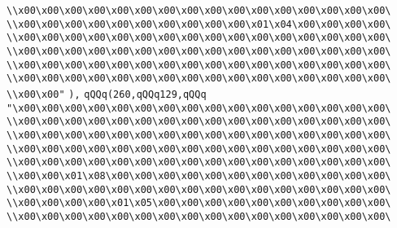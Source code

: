 \verb|\\x00\x00\x00\x00\x00\x00\x00\x00\x00\x00\x00\x00\x00\x00\x00\x00\|\newline
\verb|\\x00\x00\x00\x00\x00\x00\x00\x00\x00\x00\x01\x04\x00\x00\x00\x00\|\newline
\verb|\\x00\x00\x00\x00\x00\x00\x00\x00\x00\x00\x00\x00\x00\x00\x00\x00\|\newline
\verb|\\x00\x00\x00\x00\x00\x00\x00\x00\x00\x00\x00\x00\x00\x00\x00\x00\|\newline
\verb|\\x00\x00\x00\x00\x00\x00\x00\x00\x00\x00\x00\x00\x00\x00\x00\x00\|\newline
\verb|\\x00\x00\x00\x00\x00\x00\x00\x00\x00\x00\x00\x00\x00\x00\x00\x00\|\newline
\verb|\\x00\x00"|\newline
\verb|),|\newline
\verb|qQQq(260,qQQq129,qQQq|\newline
\verb|"\x00\x00\x00\x00\x00\x00\x00\x00\x00\x00\x00\x00\x00\x00\x00\x00\|\newline
\verb|\\x00\x00\x00\x00\x00\x00\x00\x00\x00\x00\x00\x00\x00\x00\x00\x00\|\newline
\verb|\\x00\x00\x00\x00\x00\x00\x00\x00\x00\x00\x00\x00\x00\x00\x00\x00\|\newline
\verb|\\x00\x00\x00\x00\x00\x00\x00\x00\x00\x00\x00\x00\x00\x00\x00\x00\|\newline
\verb|\\x00\x00\x00\x00\x00\x00\x00\x00\x00\x00\x00\x00\x00\x00\x00\x00\|\newline
\verb|\\x00\x00\x01\x08\x00\x00\x00\x00\x00\x00\x00\x00\x00\x00\x00\x00\|\newline
\verb|\\x00\x00\x00\x00\x00\x00\x00\x00\x00\x00\x00\x00\x00\x00\x00\x00\|\newline
\verb|\\x00\x00\x00\x00\x01\x05\x00\x00\x00\x00\x00\x00\x00\x00\x00\x00\|\newline
\verb|\\x00\x00\x00\x00\x00\x00\x00\x00\x00\x00\x00\x00\x00\x00\x00\x00\|\newline
